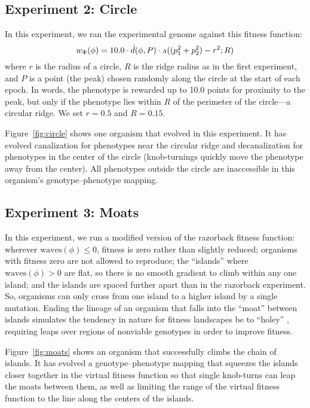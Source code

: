 \documentclass[letterpaper]{article}
\newcommand{\invv}{\ensuremath{\rotatebox[origin=c]{180}{\textrm{v}}}\xspace}
\begin{document}
\subsection{Experiment 2: Circle}

In this experiment, we ran the experimental genome against this fitness
function:
\[
  w_\Phi(\phi) = 10.0 \cdot \hat{d}(\phi, P)
                      \cdot \invv((p_1^2 + p_2^2) - r^2; R)
\]
where $r$ is the radius of a circle, $R$ is the ridge radius as in the first
experiment, and $P$ is a point (the peak) chosen randomly along the circle
at the start of each epoch. In words, the phenotype is rewarded up to 10.0
points for proximity to the peak, but only if the phenotype lies within $R$
of the perimeter of the circle---a circular ridge. We set $r=0.5$ and $R=0.15$.

Figure~\ref{fig:circle} shows one organism that evolved in this experiment. It
has evolved canalization for phenotypes near the circular ridge and
decanalization for phenotypes in the center of the circle (knob-turnings
quickly move the phenotype away from the center). All phenotypes outside the
circle are inaccessible in this organism's genotype--phenotype mapping.

\subsection{Experiment 3: Moats}

In this experiment, we run a modified version of the razorback fitness
function: wherever $\text{waves}(\phi) \leq 0$, fitness is zero rather than
slightly reduced; organisms with fitness zero are not allowed to
reproduce; the ``islands'' where $\text{waves}(\phi) > 0$ are flat, so
there is no smooth gradient to climb within any one island; and the islands are
spaced further apart than in the razorback experiment. So, organisms can only
cross from one island to a higher island by a single mutation. Ending the
lineage of an organism that falls into the ``moat'' between islands simulates
the tendency in nature for fitness landscapes be to ``holey''
\citep{gavrilets1997evolution}, requiring leaps over regions of
nonviable genotypes in order to improve fitness.

Figure~\ref{fig:moats} shows an organism that successfully climbs the chain of
islands.  It has evolved a genotype--phenotype mapping that squeezes the
islands closer together in the virtual fitness function so that single
knob-turns can leap the moats between them, as well as limiting the range of
the virtual fitness function to the line along the centers of the islands.
\end{document}
